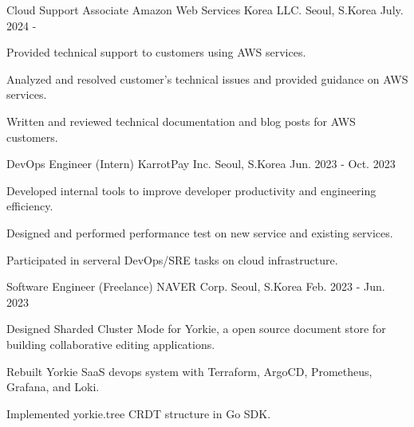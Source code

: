 

\begin{cventries}

\cventry
    {Cloud Support Associate} %
    {Amazon Web Services Korea LLC.} %
    {Seoul, S.Korea} %
    {July. 2024 - } %
    {
      \begin{cvitems} %
        \item {Provided technical support to customers using AWS services.}
        \item {Analyzed and resolved customer's technical issues and provided guidance on AWS services.}
        \item {Written and reviewed technical documentation and blog posts for AWS customers.}
      \end{cvitems}
    }

\cventry
    {DevOps Engineer (Intern)} %
    {KarrotPay Inc.} %
    {Seoul, S.Korea} %
    {Jun. 2023 - Oct. 2023} %
    {
      \begin{cvitems} %
        \item {Developed internal tools to improve developer productivity and engineering efficiency.}
        \item {Designed and performed performance test on new service and existing services.}
        \item {Participated in serveral DevOps/SRE tasks on cloud infrastructure.}
      \end{cvitems}
    }

  \cventry
    {Software Engineer (Freelance)} %
    {NAVER Corp.} %
    {Seoul, S.Korea} %
    {Feb. 2023 - Jun. 2023} %
    {
      \begin{cvitems} %
        \item {Designed Sharded Cluster Mode for Yorkie, a open source document store for building collaborative editing applications.}
        \item {Rebuilt Yorkie SaaS devops system with Terraform, ArgoCD, Prometheus, Grafana, and Loki.}
        \item {Implemented yorkie.tree CRDT structure in Go SDK.}
      \end{cvitems}
    }


\end{cventries}

